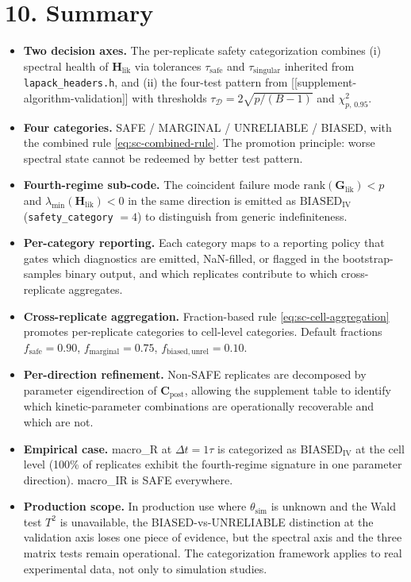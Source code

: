\documentclass[11pt]{article}
\begin{document}
\section*{10. Summary}
\label{sec:sc-summary}

\begin{itemize}
\item \textbf{Two decision axes.} The per-replicate safety
  categorization combines (i) spectral health of
  $\mathbf H_{\mathrm{lik}}$ via tolerances $\tau_{\mathrm{safe}}$
  and $\tau_{\mathrm{singular}}$ inherited from
  \texttt{lapack\_headers.h}, and (ii) the four-test pattern from
  [[supplement-algorithm-validation]] with thresholds
  $\tau_{\mathcal D} = 2\sqrt{p/(B-1)}$ and $\chi^2_{p,\,0.95}$.
\item \textbf{Four categories.} SAFE / MARGINAL / UNRELIABLE /
  BIASED, with the combined rule \eqref{eq:sc-combined-rule}. The
  promotion principle: worse spectral state cannot be redeemed by
  better test pattern.
\item \textbf{Fourth-regime sub-code.} The coincident failure mode
  $\mathrm{rank}(\mathbf G_{\mathrm{lik}}) < p$ and
  $\lambda_{\min}(\mathbf H_{\mathrm{lik}}) < 0$ in the same direction
  is emitted as $\mathrm{BIASED}_{\mathrm{IV}}$
  (\texttt{safety\_category} $= 4$) to distinguish from generic
  indefiniteness.
\item \textbf{Per-category reporting.} Each category maps to a
  reporting policy that gates which diagnostics are emitted, NaN-filled,
  or flagged in the bootstrap-samples binary output, and which
  replicates contribute to which cross-replicate aggregates.
\item \textbf{Cross-replicate aggregation.} Fraction-based rule
  \eqref{eq:sc-cell-aggregation} promotes per-replicate categories to
  cell-level categories. Default fractions $f_{\mathrm{safe}} = 0.90$,
  $f_{\mathrm{marginal}} = 0.75$, $f_{\mathrm{biased,unrel}} = 0.10$.
\item \textbf{Per-direction refinement.} Non-SAFE replicates are
  decomposed by parameter eigendirection of $\mathbf C_{\mathrm{post}}$,
  allowing the supplement table to identify which kinetic-parameter
  combinations are operationally recoverable and which are not.
\item \textbf{Empirical case.} macro\_R at $\Delta t = 1\tau$ is
  categorized as $\mathrm{BIASED}_{\mathrm{IV}}$ at the cell level
  (100\% of replicates exhibit the fourth-regime signature in one
  parameter direction). macro\_IR is SAFE everywhere.
\item \textbf{Production scope.} In production use where
  $\theta_{\mathrm{sim}}$ is unknown and the Wald test $T^2$ is
  unavailable, the BIASED-vs-UNRELIABLE distinction at the validation
  axis loses one piece of evidence, but the spectral axis and the
  three matrix tests remain operational. The categorization framework
  applies to real experimental data, not only to simulation studies.
\end{itemize}
\end{document}
